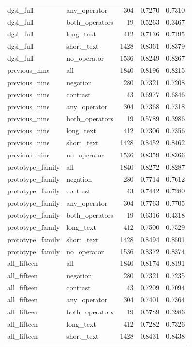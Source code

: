 \begin{tabular}{llrrr}
dgsl\_full & any\_operator & 304 & 0.7270 & 0.7310 \\
dgsl\_full & both\_operators & 19 & 0.5263 & 0.3467 \\
dgsl\_full & long\_text & 412 & 0.7136 & 0.7195 \\
dgsl\_full & short\_text & 1428 & 0.8361 & 0.8379 \\
dgsl\_full & no\_operator & 1536 & 0.8249 & 0.8267 \\
previous\_nine & all & 1840 & 0.8196 & 0.8215 \\
previous\_nine & negation & 280 & 0.7321 & 0.7208 \\
previous\_nine & contrast & 43 & 0.6977 & 0.6846 \\
previous\_nine & any\_operator & 304 & 0.7368 & 0.7318 \\
previous\_nine & both\_operators & 19 & 0.5789 & 0.3986 \\
previous\_nine & long\_text & 412 & 0.7306 & 0.7356 \\
previous\_nine & short\_text & 1428 & 0.8452 & 0.8462 \\
previous\_nine & no\_operator & 1536 & 0.8359 & 0.8366 \\
prototype\_family & all & 1840 & 0.8272 & 0.8287 \\
prototype\_family & negation & 280 & 0.7714 & 0.7612 \\
prototype\_family & contrast & 43 & 0.7442 & 0.7280 \\
prototype\_family & any\_operator & 304 & 0.7763 & 0.7705 \\
prototype\_family & both\_operators & 19 & 0.6316 & 0.4318 \\
prototype\_family & long\_text & 412 & 0.7500 & 0.7529 \\
prototype\_family & short\_text & 1428 & 0.8494 & 0.8501 \\
prototype\_family & no\_operator & 1536 & 0.8372 & 0.8374 \\
all\_fifteen & all & 1840 & 0.8174 & 0.8191 \\
all\_fifteen & negation & 280 & 0.7321 & 0.7235 \\
all\_fifteen & contrast & 43 & 0.7209 & 0.7094 \\
all\_fifteen & any\_operator & 304 & 0.7401 & 0.7364 \\
all\_fifteen & both\_operators & 19 & 0.5789 & 0.3986 \\
all\_fifteen & long\_text & 412 & 0.7282 & 0.7326 \\
all\_fifteen & short\_text & 1428 & 0.8431 & 0.8438 \\

\end{tabular}
